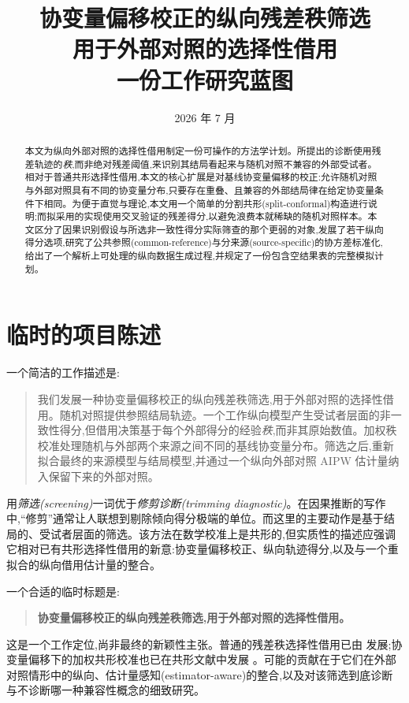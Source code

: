 \documentclass[11pt]{article}
\title{\textbf{协变量偏移校正的纵向残差秩筛选\\用于外部对照的选择性借用}\\[0.5em]
\large 一份工作研究蓝图}
\author{}
\date{2026 年 7 月}
\begin{document}
\maketitle

\begin{abstract}
本文为纵向外部对照的选择性借用制定一份可操作的方法学计划。所提出的诊断使用残差轨迹的\emph{秩},而非绝对残差阈值,来识别其结局看起来与随机对照不兼容的外部受试者。相对于普通共形选择性借用,本文的核心扩展是对基线协变量偏移的校正:允许随机对照与外部对照具有不同的协变量分布,只要存在重叠、且兼容的外部结局律在给定协变量条件下相同。为便于直觉与理论,本文用一个简单的分割共形(split-conformal)构造进行说明;而拟采用的实现使用交叉验证的残差得分,以避免浪费本就稀缺的随机对照样本。本文区分了因果识别假设与所选非一致性得分实际筛查的那个更弱的对象,发展了若干纵向得分选项,研究了公共参照(common-reference)与分来源(source-specific)的协方差标准化,给出了一个解析上可处理的纵向数据生成过程,并规定了一份包含空结果表的完整模拟计划。
\end{abstract}

\tableofcontents
\newpage

\section{临时的项目陈述}

一个简洁的工作描述是:

\begin{quote}
我们发展一种协变量偏移校正的纵向残差秩筛选,用于外部对照的选择性借用。随机对照提供参照结局轨迹。一个工作纵向模型产生受试者层面的非一致性得分,但借用决策基于每个外部得分的经验\emph{秩},而非其原始数值。加权秩校准处理随机与外部两个来源之间不同的基线协变量分布。筛选之后,重新拟合最终的来源模型与结局模型,并通过一个纵向外部对照 AIPW 估计量纳入保留下来的外部对照。
\end{quote}

用\emph{筛选(screening)}一词优于\emph{修剪诊断(trimming diagnostic)}。在因果推断的写作中,``修剪''通常让人联想到剔除倾向得分极端的单位。而这里的主要动作是基于结局的、受试者层面的筛选。该方法在数学校准上是共形的,但实质性的描述应强调它相对已有共形选择性借用的新意:协变量偏移校正、纵向轨迹得分,以及与一个重拟合的纵向借用估计量的整合。

一个合适的临时标题是:

\begin{quote}
\textbf{协变量偏移校正的纵向残差秩筛选,用于外部对照的选择性借用。}
\end{quote}

这是一个工作定位,尚非最终的新颖性主张。普通的残差秩选择性借用已由 \citet{zhu2025csb} 发展;协变量偏移下的加权共形校准也已在共形文献中发展 \citep{tibshirani2019weighted,jin2026weighted}。可能的贡献在于它们在外部对照情形中的纵向、估计量感知(estimator-aware)的整合,以及对该筛选到底诊断与不诊断哪一种兼容性概念的细致研究。
\end{document}
